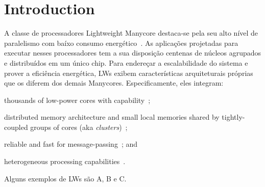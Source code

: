 \section{Introduction}
\label{sec:introduction}

	A classe de processadores Lightweight Manycore destaca-se pela seu alto
	nível de paralelismo com baíxo consumo energético~\cite{francesquini2015}. As
	aplicações projetadas para executar nesses processadores tem a sua disposição
	centenas de núcleos agrupados e distribuídos em um único chip. Para endereçar
	a escalabilidade do sistema e prover a eficiência energética, LWs exibem
	características arquiteturais próprias que os diferem dos demais Manycores.
	Especificamente, eles integram:
	\begin{enumerate*}[label=(\roman*)]
		\item thousands of low-power cores with \mimd capability~\cite{Rossi2017};

		\item distributed memory architecture and small local memories shared by
			tightly-coupled groups of cores (aka \textit{clusters})~\cite{Bohnenstiehl2017};

		\item reliable and fast \nocs for message-passing~\cite{Bohnenstiehl2017}; and

		\item heterogeneous processing capabilities~\cite{Davidson2018}.
	\end{enumerate*}
	Alguns exemplos de LWs são A, B e C.

\iffalse
	Esses processadores introduziram junto de suas vantagens, um conjunto de
	desafios no projeto e desenvolvimento de aplicações de baíxo e alto nível
	inserido pelas suas características arquiteturais. Algumas desses desafios
	são:
	\begin{itemize}
		\item Modelo de Programação Híbrida: uso do modelo de memória
			compartilhada para explorar o paralelismo dentro dos clusters e
			aplicação do modelo de troca de mensagens para lidar com
			comunicação entre clusters através da NoC~\cite{kelly2013};

		\item Falta de suporte em hardware para coerência de cache: para
			reduzir o consumo de energia requirindo o controle explícito da
			memória~\cite{francesquini2015};.

		\item Sistem de memória restritivo: a presença de múltiplos espaços de
			endereçamento e pequenas memórias locais requer o Data Tiling
			e Prefetching seja manipulado em software~\cite{Castro2016};

		\item Configurações heterogeneas: requer a programação de componentes
			distintos, dificultando o deploy de aplicações no
			LWs~\cite{Barbalace2015}.
	\end{itemize}
\fi

